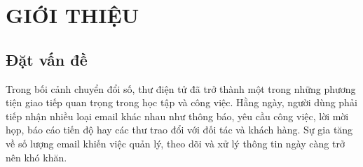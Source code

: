 \documentclass[../DoAn.tex]{subfiles}
\begin{document}
\chapter{GIỚI THIỆU}





\section{Đặt vấn đề}
\label{section:1.1}

Trong bối cảnh chuyển đổi số, thư điện tử đã trở thành một trong những phương tiện giao tiếp quan trọng trong học tập và công việc. Hằng ngày, người dùng phải tiếp nhận nhiều loại email khác nhau như thông báo, yêu cầu công việc, lời mời họp, báo cáo tiến độ hay các thư trao đổi với đối tác và khách hàng. Sự gia tăng về số lượng email khiến việc quản lý, theo dõi và xử lý thông tin ngày càng trở nên khó khăn.
\end{document}
